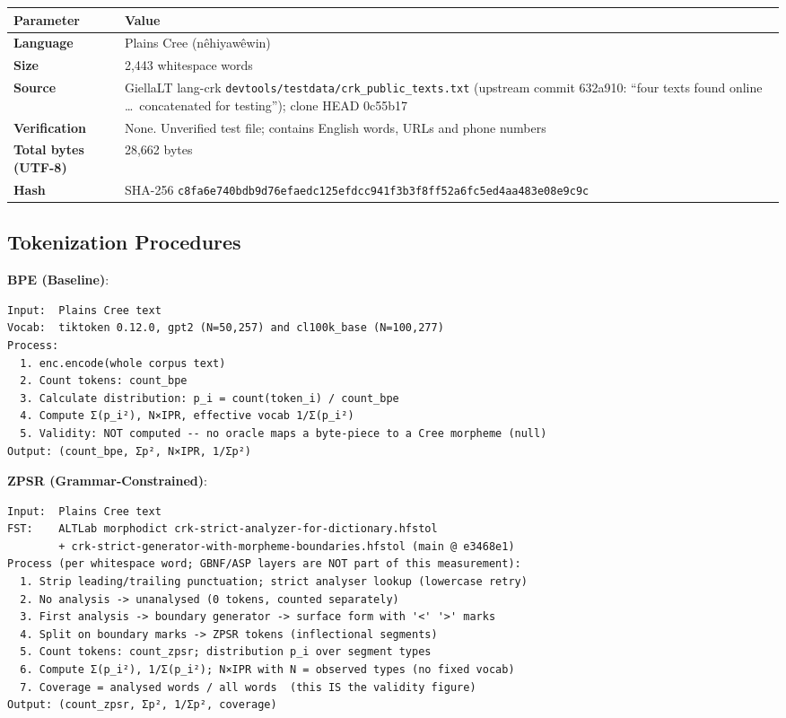 \documentclass[11pt,oneside]{article}
\begin{document}
\begin{center}
\begin{tabular}{ll}
\toprule
Parameter & Value \\
\midrule
\textbf{Language} & Plains Cree (n\^{e}hiyaw\^{e}win) \\
\textbf{Size} & 2,443 whitespace words \\
\textbf{Source} & GiellaLT lang-crk \texttt{devtools/testdata/crk\_public\_texts.txt} (upstream commit 632a910: ``four texts found online \ldots\ concatenated for testing''); clone HEAD 0c55b17 \\
\textbf{Verification} & None. Unverified test file; contains English words, URLs and phone numbers \\
\textbf{Total bytes (UTF-8)} & 28,662 bytes \\
\textbf{Hash} & SHA-256 \texttt{c8fa6e740bdb9d76efaedc125efdcc941f3b3f8ff52a6fc5ed4aa483e08e9c9c} \\
\bottomrule
\end{tabular}
\end{center}

\subsection{Tokenization Procedures}

\textbf{BPE (Baseline)}:
\begin{lstlisting}
Input:  Plains Cree text
Vocab:  tiktoken 0.12.0, gpt2 (N=50,257) and cl100k_base (N=100,277)
Process:
  1. enc.encode(whole corpus text)
  2. Count tokens: count_bpe
  3. Calculate distribution: p_i = count(token_i) / count_bpe
  4. Compute Σ(p_i²), N×IPR, effective vocab 1/Σ(p_i²)
  5. Validity: NOT computed -- no oracle maps a byte-piece to a Cree morpheme (null)
Output: (count_bpe, Σp², N×IPR, 1/Σp²)
\end{lstlisting}

\textbf{ZPSR (Grammar-Constrained)}:
\begin{lstlisting}
Input:  Plains Cree text
FST:    ALTLab morphodict crk-strict-analyzer-for-dictionary.hfstol
        + crk-strict-generator-with-morpheme-boundaries.hfstol (main @ e3468e1)
Process (per whitespace word; GBNF/ASP layers are NOT part of this measurement):
  1. Strip leading/trailing punctuation; strict analyser lookup (lowercase retry)
  2. No analysis -> unanalysed (0 tokens, counted separately)
  3. First analysis -> boundary generator -> surface form with '<' '>' marks
  4. Split on boundary marks -> ZPSR tokens (inflectional segments)
  5. Count tokens: count_zpsr; distribution p_i over segment types
  6. Compute Σ(p_i²), 1/Σ(p_i²); N×IPR with N = observed types (no fixed vocab)
  7. Coverage = analysed words / all words  (this IS the validity figure)
Output: (count_zpsr, Σp², 1/Σp², coverage)
\end{lstlisting}
\end{document}
